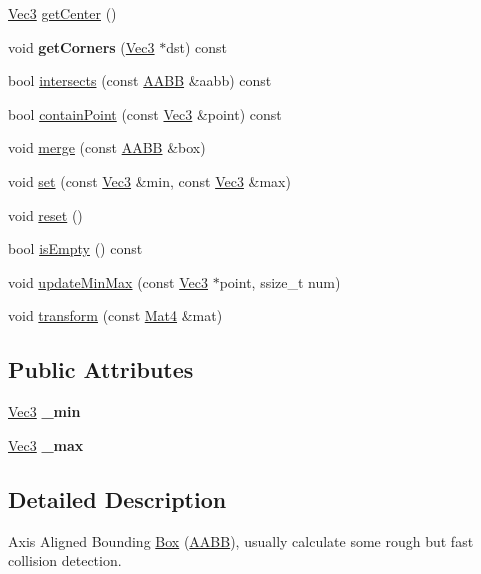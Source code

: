 \begin{DoxyCompactItemize}
\item 
\hyperlink{classVec3}{Vec3} \hyperlink{classAABB_a43ae5dd7957d00b97b8d567476826762}{get\+Center} ()
\item 
\mbox{\label{classAABB_adda7549e43f3a86134d0a90d21ba6251}} 
void {\bfseries get\+Corners} (\hyperlink{classVec3}{Vec3} $\ast$dst) const
\item 
bool \hyperlink{classAABB_abc1e3b1f4eccf3f2e3c7683a92b8bda3}{intersects} (const \hyperlink{classAABB}{A\+A\+BB} \&aabb) const
\item 
bool \hyperlink{classAABB_a5ff6408910dc4efafc325458a44a7835}{contain\+Point} (const \hyperlink{classVec3}{Vec3} \&point) const
\item 
void \hyperlink{classAABB_ad629f50f834164e7a4d451268798db5a}{merge} (const \hyperlink{classAABB}{A\+A\+BB} \&box)
\item 
void \hyperlink{classAABB_affb444abca90805ba57c528e9ccf3197}{set} (const \hyperlink{classVec3}{Vec3} \&min, const \hyperlink{classVec3}{Vec3} \&max)
\item 
void \hyperlink{classAABB_a5cbdbeaef02a2a748105c940c49bba74}{reset} ()
\item 
bool \hyperlink{classAABB_a477f106679bcd7dd24c3836bb242e542}{is\+Empty} () const
\item 
void \hyperlink{classAABB_a08f4e4ad7a09b30f79ab80a0c6056ede}{update\+Min\+Max} (const \hyperlink{classVec3}{Vec3} $\ast$point, ssize\+\_\+t num)
\item 
void \hyperlink{classAABB_a452039f8d83a813398c23e1d47787038}{transform} (const \hyperlink{classMat4}{Mat4} \&mat)
\end{DoxyCompactItemize}
\subsection*{Public Attributes}
\begin{DoxyCompactItemize}
\item 
\mbox{\label{classAABB_a9148dc0078db0b1a619f68d61b1d7dde}} 
\hyperlink{classVec3}{Vec3} {\bfseries \+\_\+min}
\item 
\mbox{\label{classAABB_a21eb3f053498f0420f93da8d647e76fc}} 
\hyperlink{classVec3}{Vec3} {\bfseries \+\_\+max}
\end{DoxyCompactItemize}


\subsection{Detailed Description}
Axis Aligned Bounding \hyperlink{classBox}{Box} (\hyperlink{classAABB}{A\+A\+BB}), usually calculate some rough but fast collision detection. 

